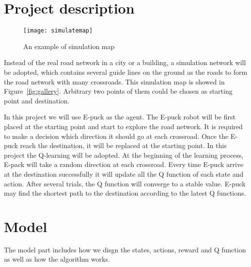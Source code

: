 \documentclass[
11pt, %
a4paper, %
oneside, %
headinclude%
BCOR3mm, %
]{scrartcl}
\begin{document}
\section{Project description}

\begin{figure}[tb]
\centering 
\texttt{[image: simulatemap]} 
\caption[An example of a floating figure]{An example of simulation map} %
\label{fig:gallery} 
\end{figure}

\quad 
Instead of the real road network in a city or a building, 
a simulation network will be adopted, which contains several guide lines on the ground as the roads to form the road network with many crossroads. 
This simulation map is showed in Figure~\vref{fig:gallery}. %
Arbitrary two points of them could be chosen as starting point and destination.

In this project we will use E-puck as the agent. 
The E-puck robot will be first placed at the starting point and start to explore the road network. 
It is required to make a decision which direction it should go at each crossroad. Once the E-puck reach the destination, 
it will be replaced at the starting point. In this project the Q-learning will be adopted.
At the beginning of the learning process, E-pack will take a random direction at each crossroad. 
Every time E-puck arrive at the destination successfully it will update all the Q function of each state and action. After several trials, the Q function will converge to a stable value.  
E-puck may find the shortest path to the destination according to the latest Q functions.




\section{Model}

\quad The model part includes how we disgn the states, actions, reward and Q function as well as how the algorithm works.

\end{document}
